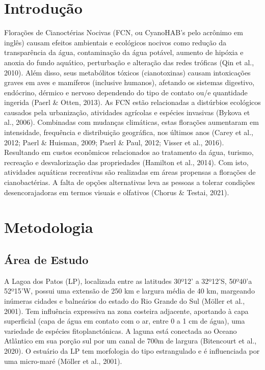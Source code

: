 \documentclass[
  super,
  preprint,
  3p]{elsarticle}
\begin{document}
    \ifdefined\Shaded\renewenvironment{Shaded}{\begin{tcolorbox}[enhanced, interior hidden, breakable, borderline west={3pt}{0pt}{shadecolor}, frame hidden, boxrule=0pt, sharp corners]}{\end{tcolorbox}}\fi

\hypertarget{introduuxe7uxe3o}{%
\section{Introdução}\label{introduuxe7uxe3o}}

Florações de Cianoctérias Nocivas (FCN, ou CyanoHAB's pelo acrônimo em
inglês) causam efeitos ambientais e ecológicos nocivos como redução da
transparência da água, contaminação da água potável, aumento de hipóxia
e anoxia do fundo aquático, perturbação e alteração das redes tróficas
(Qin et al., 2010). Além disso, seus metabólitos tóxicos (cianotoxinas)
causam intoxicações graves em aves e mamíferos (inclusive humanos),
afetando os sistemas digestivo, endócrino, dérmico e nervoso dependendo
do tipo de contato ou/e quantidade ingerida (Paerl \& Otten, 2013). As
FCN estão relacionadas a distúrbios ecológicos causados pela
urbanização, atividades agrícolas e espécies invasivas (Bykova et al.,
2006). Combinadas com mudanças climáticas, estas florações aumentaram em
intensidade, frequência e distribuição geográfica, nos últimos anos
(Carey et al., 2012; Paerl \& Huisman, 2009; Paerl \& Paul, 2012; Visser
et al., 2016). Resultando em custos econômicos relacionados ao
tratamento da água, turismo, recreação e desvalorização das propriedades
(Hamilton et al., 2014). Com isto, atividades aquáticas recreativas são
realizadas em áreas propensas a florações de cianobactérias. A falta de
opções alternativas leva as pessoas a tolerar condições desencorajadoras
em termos visuais e olfativos (Chorus \& Testai, 2021).

\hypertarget{metodologia}{%
\section{Metodologia}\label{metodologia}}

\hypertarget{uxe1rea-de-estudo}{%
\subsection{Área de Estudo}\label{uxe1rea-de-estudo}}

A Lagoa dos Patos (LP), localizada entre as latitudes 30º12' a 32º12'S,
50º40'a 52º15'W, possui uma extensão de 250 km e largura média de 40 km,
margeando inúmeras cidades e balneários do estado do Rio Grande do Sul
(Möller et al., 2001). Tem influência expressiva na zona costeira
adjacente, aportando à capa superficial (capa de água em contato com o
ar, entre 0 a 1 cm de água), uma variedade de espécies fitoplanctónicas.
A laguna está conectada ao Oceano Atlântico em sua porção sul por um
canal de 700m de largura (Bitencourt et al., 2020). O estuário da LP tem
morfologia do tipo estrangulado e é influenciada por uma micro-maré
(Möller et al., 2001).
\end{document}
